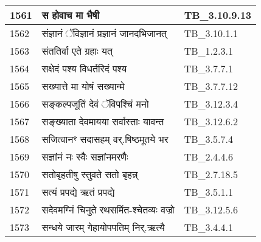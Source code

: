 \documentclass[17pt]{extarticle}
\begin{document}
\begin{longtable}{||p{0.4in}||p{4.9in}||p{0.9in}||}
    \hline
        
    1561 & स होवाच मा भैषी & TB\_3.10.9.13       \\
    
    \hline
        
    1562 & संज्ञानं ॅविज्ञानं प्रज्ञानं जानदभिजानत् & TB\_3.10.1.1       \\
    
    \hline
        
    1563 & संततिर्वा एते ग्रहाः यत् & TB\_1.2.3.1       \\
    
    \hline
        
    1564 & सक्षेदं पश्य विधर्तरिदं पश्य & TB\_3.7.7.1       \\
    
    \hline
        
    1565 & सख्यात्ते मा योषं सख्यान्मे & TB\_3.7.7.12       \\
    
    \hline
        
    1566 & सङ्कल्पजूतिं देवं ॅविपश्चिं मनो & TB\_3.12.3.4       \\
    
    \hline
        
    1567 & सङ्ख्याता देवमायया सर्वास्ताः यावन्त & TB\_3.12.6.2       \\
    
    \hline
        
    1568 & सजित्वानꣳ सदासहम् वर्.षिष्ठमूतये भर & TB\_3.5.7.4       \\
    
    \hline
        
    1569 & सज्ञांनं नः स्वैः सज्ञांनमरणैः & TB\_2.4.4.6       \\
    
    \hline
        
    1570 & सतोबृहतीषु स्तुवते सतो बृहन्न् & TB\_2.7.18.5       \\
    
    \hline
        
    1571 & सत्यं प्रपद्ये ऋतं प्रपद्ये & TB\_3.5.1.1       \\
    
    \hline
        
    1572 & सदेवमग्निं चिनुते रथसमिंत{-}श्चेतव्यः वज्रो & TB\_3.12.5.6       \\
    
    \hline
        
    1573 & सन्धये जारम् गेहायोपपतिम् निर्.ऋत्यै & TB\_3.4.4.1       \\
    

\end{longtable}
\end{document}
